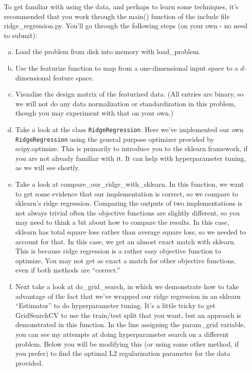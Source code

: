 \documentclass{article}
\begin{document}
To get familiar with using the data, and perhaps to learn some techniques,
it's recommended that you work through the main() function of the
include file ridge\_regression.py. You'll go through the following
steps (on your own - no need to submit):
\begin{enumerate}[(a)]
\item Load the problem from disk into memory with load\_problem.
\item Use the featurize function to map from a one-dimensional input space
to a $d$-dimensional feature space.
\item Visualize the design matrix of the featurized data. (All entries are
binary, so we will not do any data normalization or standardization
in this problem, though you may experiment with that on your own.)
\item Take a look at the class \texttt{RidgeRegression}. Here we've implemented
our own \texttt{RidgeRegression} using the general purpose optimizer
provided by scipy.optimize. This is primarily to introduce you to
the sklearn framework, if you are not already familiar with it. It
can help with hyperparameter tuning, as we will see shortly.
\item Take a look at compare\_our\_ridge\_with\_sklearn. In this function,
we want to get some evidence that our implementation is correct, so
we compare to sklearn's ridge regression. Comparing the outputs of
two implementations is not always trivial \textendash{} often the
objective functions are slightly different, so you may need to think
a bit about how to compare the results. In this case, sklearn has
total square loss rather than average square loss, so we needed to
account for that. In this case, we get an almost exact match with
sklearn. This is because ridge regression is a rather easy objective
function to optimize. You may not get as exact a match for other objective
functions, even if both methods are ``correct.''
\item Next take a look at do\_grid\_search, in which we demonstrate how
to take advantage of the fact that we've wrapped our ridge regression
in an sklearn ``Estimator'' to do hyperparameter tuning. It's a
little tricky to get GridSearchCV to use the train/test split that
you want, but an approach is demonstrated in this function. In the
line assigning the param\_grid variable, you can see my attempts at
doing hyperparameter search on a different problem. Below you will
be modifying this (or using some other method, if you prefer) to find
the optimal L2 regularization parameter for the data provided.
\end{enumerate}
\end{document}
